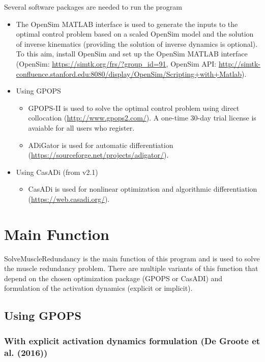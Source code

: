 \documentclass[a4paper,oneside,11pt]{article}
\begin{document}
Several software packages are needed to run the program
\begin{itemize}
	\item The OpenSim MATLAB interface is used to generate the inputs to the optimal control problem based on a scaled OpenSim model and the solution of inverse kinematics (providing the solution of inverse dynamics is optional). To this aim, install OpenSim and set up the OpenSim MATLAB interface (OpenSim: \url{https://simtk.org/frs/?group_id=91}, OpenSim API: \url{http://simtk-confluence.stanford.edu:8080/display/OpenSim/Scripting+with+Matlab}).
	\item Using GPOPS
	\begin{itemize}
	\item GPOPS-II is used to solve the optimal control problem using direct collocation (\url{http://www.gpops2.com/}). A one-time 30-day trial license is avaiable for all users who register.
	\item ADiGator is used for automatic differentiation (\url{https://sourceforge.net/projects/adigator/}).
	\end{itemize}
	\item Using CasADi (from v2.1)
	\begin{itemize}
	\item CasADi is used for nonlinear optimization and algorithmic differentiation (\url{https://web.casadi.org/}).
	\end{itemize}
\end{itemize}

\section{Main Function}

SolveMuscleRedundancy is the main function of this program and is used to solve the muscle redundancy problem. There are multiple variants of this function that depend on the chosen optimization package (GPOPS or CasADI) and formulation of the activation dynamics (explicit or implicit).

\subsection{Using GPOPS}

\subsubsection{With explicit activation dynamics formulation (De Groote et al. (2016))}
\end{document}
